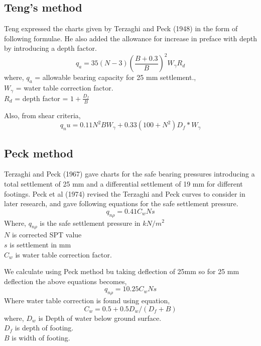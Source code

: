 \subsection{Teng's method}
Teng expressed the charts given by Terzaghi and Peck (1948) in the form of following formulae. He also added the allowance for increase in preface with depth by introducing a depth factor.
\begin{equation}
q_a = 35 (N-3) (\frac{B+0.3}{B})^2 W_\gamma R_d
\end{equation}
where,
$q_a$ = allowable bearing capacity for 25 mm settlement.,\\
$W_\gamma$ = water table correction factor.\\
$R_d$ = depth factor = $1 + \frac{D_f}{B}$

Also, from shear criteria,
\begin{equation}
q_nu = 0.11 N^2 B {W_\gamma} + 0.33 (100+N^2)D_f*{W_\gamma}
\end{equation}

\subsection{Peck method}
Terzaghi and Peck (1967) gave charts for the safe bearing pressures introducing a total settlement of 25 mm and a differential settlement of 19 mm for different footings. Peck et al (1974) revised the Terzaghi and Peck curves to consider in later research, and gave following equations for the safe settlement pressure.
\begin{equation}
q_{n\rho} = 0.41 C_w Ns
\end{equation}
Where,
 $q_{n\rho}$ is the safe settlement pressure in $kN/m^2$\\
 $N$ is corrected SPT value\\
 $s$ is settlement in mm\\
 $C_w$ is water table correction factor.
 
We calculate using Peck method bu taking deflection of 25mm so for 25 mm deflection the above equations becomes,
\begin{equation}
q_{n\rho} = 10.25 C_w Ns
\end{equation}
Where water table correction is found using equation,
\begin{equation}
C_w=0.5+0.5 D_w / (D_f + B)
\end{equation}
where,
$D_w$ is Depth of water below ground surface.\\
$D_f$  is depth of footing.\\
$B$ is width of footing.

